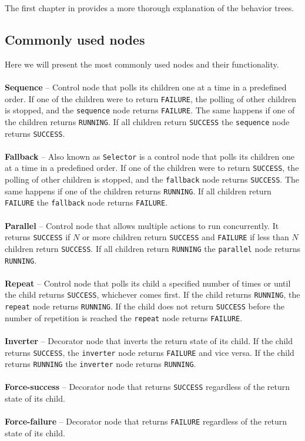     \noindent The first chapter in \cite{BT_intro} provides a more thorough explanation of the behavior trees.

    \subsection{Commonly used nodes}
        Here we will present the most commonly used nodes and their functionality.\\\\
        \textbf{Sequence} -- Control node that polls its children one at a time in a predefined order. If one of the children were to return \texttt{FAILURE}, the polling of other children is stopped, and the \texttt{sequence} node returns \texttt{FAILURE}. The same happens if one of the children returns \texttt{RUNNING}. If all children return \texttt{SUCCESS} the \texttt{sequence} node returns \texttt{SUCCESS}.\\\\
        \textbf{Fallback} -- Also known as \texttt{Selector} is a control node that polls its children one at a time in a predefined order. If one of the children were to return \texttt{SUCCESS}, the polling of other children is stopped, and the \texttt{fallback} node returns \texttt{SUCCESS}. The same happens if one of the children returns \texttt{RUNNING}. If all children return \texttt{FAILURE} the \texttt{fallback} node returns \texttt{FAILURE}.\\\\
        \textbf{Parallel} -- Control node that allows multiple actions to run concurrently. It returns \texttt{SUCCESS} if $N$ or more children return \texttt{SUCCESS} and \texttt{FAILURE} if less than $N$ children return \texttt{SUCCESS}. If all children return \texttt{RUNNING} the \texttt{parallel} node returns \texttt{RUNNING}.\\\\
        \textbf{Repeat} -- Control node that polls its child a specified number of times or until the child returns \texttt{SUCCESS}, whichever comes first. If the child returns \texttt{RUNNING}, the \texttt{repeat} node returns \texttt{RUNNING}. If the child does not return \texttt{SUCCESS} before the number of repetition is reached the \texttt{repeat} node returns \texttt{FAILURE}.\\\\
        \textbf{Inverter} -- Decorator node that inverts the return state of its child. If the child returns \texttt{SUCCESS}, the \texttt{inverter} node returns \texttt{FAILURE} and vice versa. If the child returns \texttt{RUNNING} the \texttt{inverter} node returns \texttt{RUNNING}.\\\\
        \textbf{Force-success} -- Decorator node that returns \texttt{SUCCESS} regardless of the return state of its child.\\\\
        \textbf{Force-failure} -- Decorator node that returns \texttt{FAILURE} regardless of the return state of its child.

